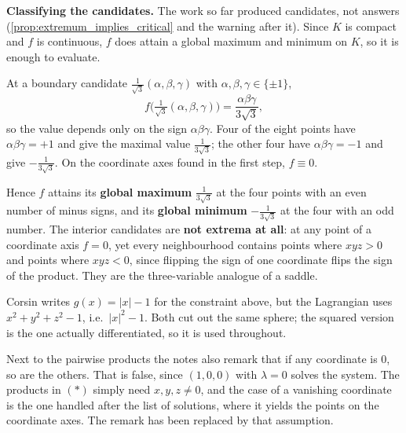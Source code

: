 \begin{example}[Extrema of $xyz$ on the unit ball]
\textbf{Classifying the candidates.} The work so far produced candidates, not answers
(\cref{prop:extremum_implies_critical} and the warning after it). Since $K$ is compact and $f$
is continuous, $f$ does attain a global maximum and minimum on $K$, so it is enough to evaluate.

At a boundary candidate $\tfrac{1}{\sqrt3}(\alpha,\beta,\gamma)$ with
$\alpha,\beta,\gamma \in \{\pm1\}$,
\[f\Big(\tfrac{1}{\sqrt3}(\alpha,\beta,\gamma)\Big)
  = \frac{\alpha\beta\gamma}{3\sqrt3},\]
so the value depends only on the sign $\alpha\beta\gamma$. Four of the eight points have
$\alpha\beta\gamma = +1$ and give the maximal value $\tfrac{1}{3\sqrt3}$; the other four have
$\alpha\beta\gamma = -1$ and give $-\tfrac{1}{3\sqrt3}$. On the coordinate axes found in the
first step, $f \equiv 0$.

Hence $f$ attains its \textbf{global maximum} $\tfrac{1}{3\sqrt3}$ at the four points with an
even number of minus signs, and its \textbf{global minimum} $-\tfrac{1}{3\sqrt3}$ at the four
with an odd number. The interior candidates are \textbf{not extrema at all}: at any point of a
coordinate axis $f=0$, yet every neighbourhood contains points where $xyz>0$ and points where
$xyz<0$, since flipping the sign of one coordinate flips the sign of the product. They are the
three-variable analogue of a saddle.
\end{example}

\begin{ainote}
Corsin writes $g(x) = |x| - 1$ for the constraint above, but the Lagrangian uses
$x^2+y^2+z^2-1$, i.e.\ $|x|^2-1$. Both cut out the same sphere; the squared version is the one
actually differentiated, so it is used throughout.

Next to the pairwise products the notes also remark that if any coordinate is $0$, so are the
others. That is false, since $(1,0,0)$ with $\lambda = 0$ solves the system. The products in
$(*)$ simply need $x,y,z \neq 0$, and the case of a vanishing coordinate is the one handled after
the list of solutions, where it yields the points on the coordinate axes. The remark has been
replaced by that assumption.
\end{ainote}

